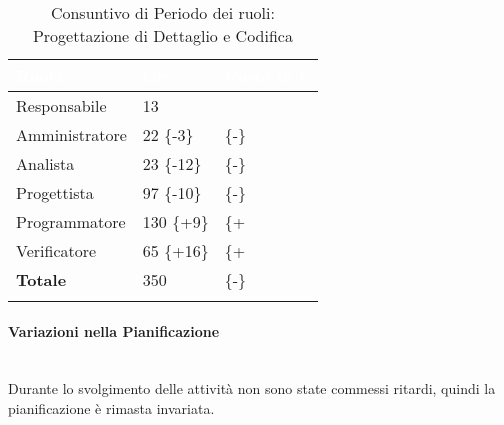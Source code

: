 \begin{longtable}{| C{.30\textwidth}| C{.15\textwidth}| C{.20\textwidth}|}
	\hline
	\textbf{\textcolor{white}{Ruolo}} & \textbf{\textcolor{white}{Ore}} & \textbf{\textcolor{white}{Costo 	in \euro}} \\
	\hline 
	Responsabile & 13 &  \\
	\hline
	Amministratore & 22 \{-3\} &   \{-\}\\
	\hline
	Analista & 23 \{-12\}&  \{-\} \\
	\hline
	Progettista & 97 \{-10\} &   \{-\}\\
	\hline
	Programmatore & 130 \{+9\} &  \{+ \\
	\hline 
	Verificatore & 65 \{+16\} &  \{+\\
	\hline
	\textbf{Totale} & 350 &  \{-\}\\
	\hline 

\caption{Consuntivo di Periodo dei ruoli: Progettazione di Dettaglio e Codifica}
\label{Distribuzione ruoli pdc}
\end{longtable}

\paragraph{Variazioni nella Pianificazione} ~\\
Durante lo svolgimento delle attività non sono state commessi ritardi, quindi la pianificazione è rimasta invariata.

